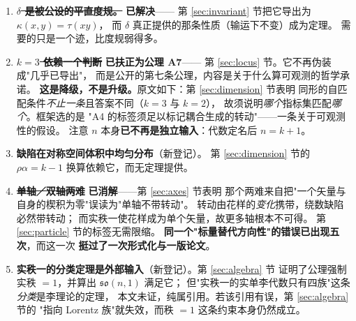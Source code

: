 \documentclass[11pt,a4paper]{article}
\theoremstyle{sudef}
\newcommand{\kron}{\delta}
\begin{document}
\begin{enumerate}[leftmargin=1.8em]
\item \sout{\textbf{$\kron$ 是被公设的平直度规。}} \textbf{已解决}——
      第 \ref{sec:invariant} 节把它导出为 $\kappa(x,y)=\tau(xy)$，
      而 $\kron$ 真正提供的那条性质（输运下不变）成为定理。
      需要的只是一个迹，比度规弱得多。
\item \sout{\textbf{$k=3$ 依赖一个判断}} \textbf{已扶正为公理 A7}——
      第 \ref{sec:locus} 节。它不再伪装成"几乎已导出"，
      而是公开的第七条公理，内容是关于什么算可观测的哲学承诺。
      \textbf{这是降级，不是升级。}原文如下：第 \ref{sec:dimension} 节表明
      同形的自匹配条件\emph{不止一条}且答案不同（$k=3$ 与 $k=2$），
      故须说明\emph{哪个}指标集匹配\emph{哪个}。框架选的是
      "A4 的标签须足以标记耦合生成的转动"——一条关于可观测性的假设。
      注意 $n$ 本身\textbf{已不再是独立输入}：代数定名后 $n=k+1$。

\item \textbf{缺陷在对称空间体积中均匀分布}（新登记）。
      第 \ref{sec:dimension} 节的 $\rho\alpha = k-1$ 换算依赖它，而无定理提供。

\item \sout{\textbf{单轴／双轴两难}} \textbf{已消解}——第 \ref{sec:axes} 节表明
      那个两难来自把"一个矢量与自身的楔积为零"误读为"单轴不带转动"。
      转动由花样的\emph{变化}携带，绕数缺陷必然带转动；
      而实秩一使花样成为单个矢量，故更多轴根本不可得。
      第 \ref{sec:particle} 节的标签无需限缩。
      \textbf{同一个"标量替代方向性"的错误已出现五次}，而这一次
      \textbf{挺过了一次形式化与一版论文}。

\item \textbf{实秩一的分类定理是外部输入}（新登记）。第 \ref{sec:algebra} 节
      证明了公理强制实秩 $=1$，并算出 $\mathfrak{so}(n,1)$ 满足它；
      但"实秩一的实单李代数只有四族"这条\emph{分类}是李理论的定理，
      本文未证，纯属引用。若该引用有误，第 \ref{sec:algebra} 节的
      "指向 Lorentz 族"就失效，而秩 $=1$ 这条约束本身仍然成立。


\end{enumerate}
\end{document}
